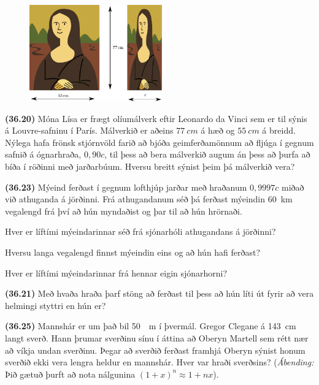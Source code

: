 \ifdefined \wholebook \else\documentclass[oneside]{book}\usepackage{EdlBook}\graphicspath{{figures/}}
\begin{document}
\begin{enumerate}[label = \textbf{(\alph*)}]

\begin{minipage}{\linewidth}

\begin{figure}
\vspace{-0.5cm}
\includegraphics[width = 2.25in]{figures/mona-lisa.pdf}
\end{figure}

\item[\textbf{(36.20)}] Móna Lísa er frægt olíumálverk eftir Leonardo da Vinci sem er til sýnis á Louvre-safninu í París. Málverkið er aðeins $\SI{77}{cm}$ á hæð og $\SI{55}{cm}$ á breidd. Nýlega hafa frönsk stjórnvöld farið að bjóða geimferðamönnum að fljúga í gegnum safnið á ógnarhraða, $0,90c$, til þess að bera málverkið augum án þess að þurfa að bíða í röðinni með jarðarbúum. Hversu breitt sýnist þeim þá málverkið vera?

\item[\textbf{(36.23)}] Mýeind ferðast í gegnum lofthjúp jarðar með hraðanum $0,9997c$ miðað við athuganda á jörðinni. Frá athugandanum séð þá ferðast mýeindin \SI{60}{km} vegalengd frá því að hún myndaðist og þar til að hún hrörnaði. \begin{enumerate*}[label = \textbf{(\alph*)}]
    \item Hver er líftími mýeindarinnar séð frá sjónarhóli athugandans á jörðinni?
    \item Hversu langa vegalengd finnst mýeindin eins og að hún hafi ferðast?
    \item Hver er líftími mýeindarinnar frá hennar eigin sjónarhorni?
\end{enumerate*}

\item[\textbf{(36.21)}] Með hvaða hraða þarf stöng að ferðast til þess að hún líti út fyrir að vera helmingi styttri en hún er?

\item[\textbf{(36.25)}] Mannshár er um það bil \SI{50}{\mu m} í þvermál. Gregor Clegane á \SI{143}{cm} langt sverð. Hann þrumar sverðinu sínu í áttina að Oberyn Martell sem rétt nær að víkja undan sverðinu. Þegar að sverðið ferðast framhjá Oberyn sýnist honum sverðið ekki vera lengra heldur en mannshár. Hver var hraði sverðsins?  (\textit{Ábending:} Þið gætuð þurft að nota nálgunina $(1+x)^n \approx 1+ nx$).

\end{minipage}


\end{enumerate}
\end{document}
